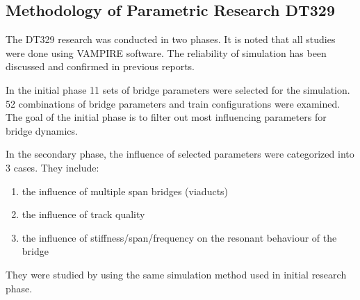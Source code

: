 \subsection{Methodology of Parametric Research DT329}

The DT329 research was conducted in two phases. It is noted that all studies were done using VAMPIRE software. The reliability of simulation has been discussed and confirmed in previous reports. 

In the initial phase 11 sets of bridge parameters were selected for the simulation. 52 combinations of bridge parameters and train configurations were examined. The goal of the initial phase is to filter out most influencing parameters for bridge dynamics.

In the secondary phase, the influence of selected parameters were categorized into 3 cases. They include:
\begin{enumerate}
 \item the influence of multiple span bridges (viaducts)
 \item the influence of track quality
 \item the influence of stiffness/span/frequency on the resonant behaviour of the bridge
\end{enumerate}
They were studied by using the same simulation method used in initial research phase.








